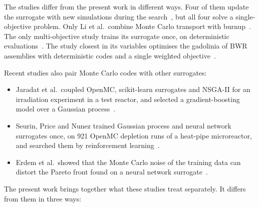 The studies differ from the present work in different ways. Four of them
update the surrogate with new simulations during the
search~\cite{sobes_2021_ai_core,li_2022_kriging_lbe,kuwagaki_2026_bo_sfr,tung_lee_2020_gd_bwr},
but all four solve a single-objective problem. Only Li et al.\ combine
Monte Carlo transport with burnup~\cite{li_2022_kriging_lbe}. The only
multi-objective study trains its surrogate once, on deterministic
evaluations~\cite{zeng_2020_sfr_opt}. The study closest in its variables
optimises the gadolinia of BWR assemblies with deterministic codes and a
single weighted objective~\cite{tung_lee_2020_gd_bwr}.

Recent studies also pair Monte Carlo codes with other surrogates:

\begin{itemize}
  \item Jaradat et al.\ coupled OpenMC, scikit-learn surrogates and
        NSGA-II for an irradiation experiment in a test reactor, and
        selected a gradient-boosting model over a Gaussian
        process~\cite{jaradat_2026_atr}.

  \item Seurin, Price and Nunez trained Gaussian process and neural
        network surrogates once, on 921 OpenMC depletion runs of a
        heat-pipe microreactor, and searched them by reinforcement
        learning~\cite{seurin_2025_hpmr}.

  \item Erdem et al.\ showed that the Monte Carlo noise of the training
        data can distort the Pareto front found on a neural network
        surrogate~\cite{erdem_2025_mc_uncertainty}.
\end{itemize}

The present work brings together what these studies treat separately.
It differs from them in three ways:


